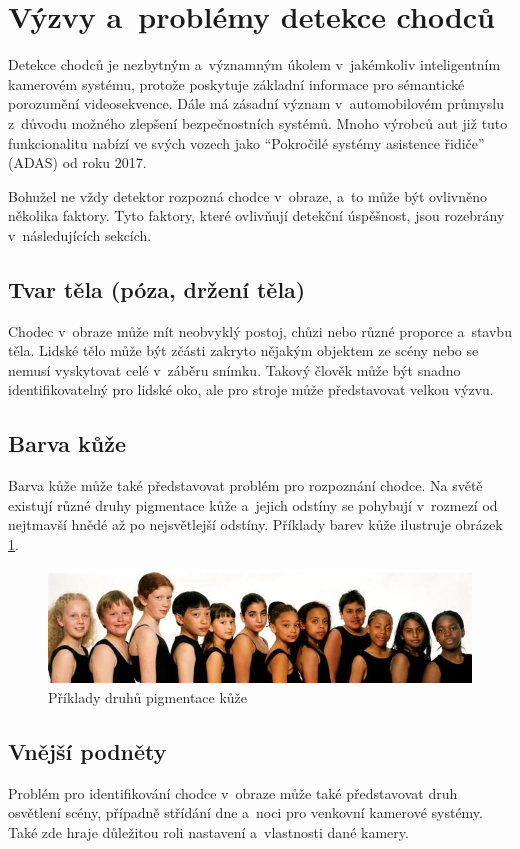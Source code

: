 \section{Výzvy a~problémy detekce chodců}
Detekce chodců je nezbytným a~významným úkolem v~jakémkoliv inteligentním kamerovém systému, protože poskytuje základní informace pro sémantické porozumění videosekvence. Dále má zásadní význam v~automobilovém průmyslu z~důvodu možného zlepšení bezpečnostních systémů. Mnoho výrobců aut již tuto funkcionalitu nabízí ve svých vozech jako ``Pokročilé systémy asistence řidiče'' (ADAS)\cite{adas} od roku 2017.

Bohužel ne vždy detektor rozpozná chodce v~obraze, a~to může být ovlivněno několika faktory. Tyto faktory, které ovlivňují detekční úspěšnost, jsou rozebrány v~následujících sekcích.

\subsection{Tvar těla (póza, držení těla)}
Chodec v~obraze může mít neobvyklý postoj, chůzi nebo různé proporce a~stavbu těla. Lidské tělo může být zčásti zakryto nějakým objektem ze scény nebo se nemusí vyskytovat celé v~záběru snímku. Takový člověk může být snadno identifikovatelný pro lidské oko, ale pro stroje může představovat velkou výzvu. 

\subsection{Barva kůže}
Barva kůže může také představovat problém pro rozpoznání chodce. Na světě existují různé druhy pigmentace kůže a~jejich odstíny se pohybují v~rozmezí od nejtmavší hnědé až po nejsvětlejší odstíny. Příklady barev kůže ilustruje obrázek \ref{colorskin}.

\begin{figure}[H]
\centering
\includegraphics[width=15cm]{figures/colorskin}
\caption{Příklady druhů pigmentace kůže\cite{skincolor:obr}}
\label{colorskin}
\end{figure}

\subsection{Vnější podněty}
Problém pro identifikování chodce v~obraze může také představovat druh osvětlení scény, případně střídání dne a~noci pro venkovní kamerové systémy. Také zde hraje důležitou roli nastavení a~vlastnosti dané kamery. 

